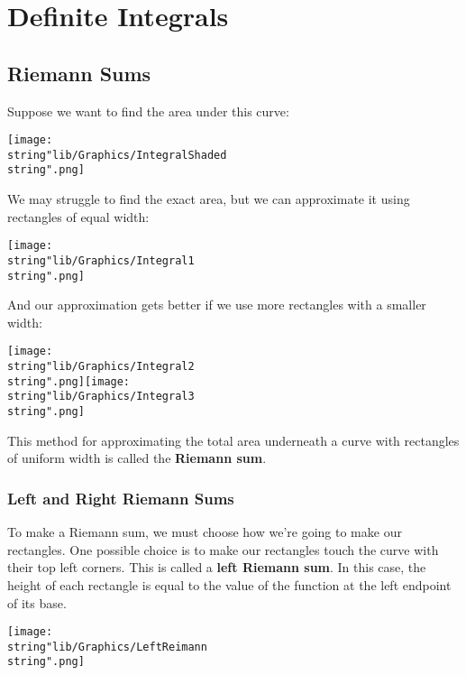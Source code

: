 \documentclass[11pt,a4paper]{book}
\begin{document}
\chapter{Definite Integrals}

\section{Riemann Sums}

Suppose we want to find the area under this curve:
\begin{center}
\texttt{[image: \\string"lib/Graphics/IntegralShaded\\string".png]}
\par\end{center}

We may struggle to find the exact area, but we can approximate it
using rectangles of equal width:
\begin{center}
\texttt{[image: \\string"lib/Graphics/Integral1\\string".png]}
\par\end{center}

And our approximation gets better if we use more rectangles with a
smaller width:
\begin{center}
\texttt{[image: \\string"lib/Graphics/Integral2\\string".png]}\hspace{1cm}\texttt{[image: \\string"lib/Graphics/Integral3\\string".png]}
\par\end{center}

This method for approximating the total area underneath a curve with
rectangles of uniform width is called the \textbf{Riemann sum}.

\newpage{}

\subsection{Left and Right Riemann Sums}

To make a Riemann sum, we must choose how we're going to make our
rectangles. One possible choice is to make our rectangles touch the
curve with their top left corners. This is called a\textbf{ left Riemann
sum}. In this case, the height of each rectangle is equal to the value
of the function at the left endpoint of its base.
\begin{center}
\texttt{[image: \\string"lib/Graphics/LeftReimann\\string".png]}
\par\end{center}
\end{document}
